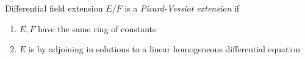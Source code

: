 \documentclass[main]{subfiles}
\begin{document}
\begin{definition}
Differential field extension $E/F$ is a \textit{Picard-Vessiot extension} if
\begin{enumerate}
\item $E,F$ have the same ring of constants
\item $E$ is by adjoining in solutions to a linear homogeneous differential equation
\end{enumerate}
\end{definition}
\end{document}
